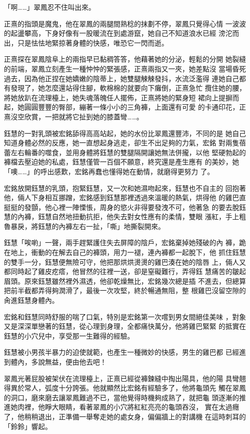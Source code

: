 「啊……」翠鳳忍不住叫出來。

正熹的指頭是魔鬼，他在翠鳳的兩腿間熟稔的抹劃不停，翠鳳只覺得心情
一波波的起盪攀高，下身好像有一股暖流在到處游竄，她自己不知道浪水已經
滂沱而出，只是怯怯地緊掠著身體的快感，唯恐它一閃而逝。

正熹探在翠鳳陰阜上的兩指早已黏稠答答，他藉著她的分泌，輕鬆的分開
她裂縫的前端，翠鳳立刻產生一種忡忡的緊張感，正熹兩指又一夾，她差點沒
當場昏死過去，因為他正捏在她嬌嫩的陰蒂上，她雙腿觫觫發抖，水流泛濫得
連她自己都有發現了，她怎麼還站得住腳，軟棉棉的就要向下癱倒，正熹急忙
攬住她的腰，將她放趴在流理檯上，她失魂落魄任人擺佈，正熹將她的緊身短
裙向上提摒而起，她圓圓豐豐的臀部，繃著一條小小的三角褲，上面還有可愛
的卡通印花，正熹沒空欣賞，一把就將它扯到她的膝蓋彎……。

鈺慧的一對乳頭被宏銘舔得高高站起，她的水份比翠鳳還豐沛，不同的是
她自己知道身體必然的反應，她一直想起身逃走，卻生不出足夠的力氣，宏銘
對兩隻蓓蕾左右輪番的噬食，並用身體將鈺慧的雙腿隔開讓她無法併攏，以他
堅硬勃起的褲檔去壓迫她的私處，鈺慧僅管一百個不願意，終究還是產生應有
的美妙，她「噢……」的呼出感歎，宏銘再蠢也懂得她在動情，就磨得更努力
了。

宏銘放開鈺慧的乳頭，抱緊鈺慧，又一次和她濕吻起來，鈺慧也不自主的
回抱著他，倆人下身相互挪蹭，宏銘感到鈺慧那裡透過來溫暖的熱氣，烘得他
的雞巴直挺挺的發顫，他心裡一陣慄悵，周身的慾火非得要發洩不可，他著急
的要去脫鈺慧的內褲，鈺慧自然地扭動抗拒，他失去對女性應有的柔情，雙眼
漲紅，手上粗魯暴戾，將鈺慧的內褲左右一扯，「嘶」地撕裂開來。

鈺慧「唉喲」一聲，兩手趕緊護住失去屏障的陰戶，宏銘棄掉她殘破的內
褲，跪在地上，衝動的在解去自己的褲頭，用力一褪，連內褲都一起脫下，他
抓住鈺慧的雙手一分，鈺慧便無險可守，他把那烘烘燙燙的雞巴湊在她的陰唇
上，倆人又都同時起了雞皮疙瘩，他冒然的往裡一送，卻是窒礙難行，弄得鈺
慧痛苦的皺起眉頭。原來鈺慧雖然裡外濕透，他卻乾燥無比，宏銘幾次總是插
不進去，但總算把前半截都弄得夠潤滑了，最後一次攻堅，終於暢通無阻，整
根雞巴沒留空隙的肏進鈺慧身體內。

宏銘和鈺慧同時舒服的喘了口氣，特別是宏銘第一次嚐到男女間絕佳美味
，對象又是深深單戀著的鈺慧，從心理到身理，全都痛快萬分，他將雞巴緊緊
的抵實在鈺慧的小穴兒中，享受那一生難得的經驗。

鈺慧被小男孩半暴力的迫使就範，也產生一種微妙的快感，男生的雞巴都
已經進到體內，多說無益，便由他去吧！

翠鳳光著屁股被架伏在流理檯上，正熹已經從褲鍊縫中掏出陽具，他的陽
具彎翹得異於常人，弧度十分誇張。他就顯然比宏銘有經驗多了，他將龜頭先
觸在翠鳳的洞口，磨來磨去讓翠鳳難過不已，當他覺得時機夠成熟了，就把龜
頭逐漸的推進她肉裡，他睜大眼睛，看著翠鳳的小穴將紅紅亮亮的龜頭吞沒，
實在太過癮了，他稍稍退出，正準備一舉奪走她的處女身，偏偏牆上的對講機
在這時刺耳的「鈴鈴」響起。


